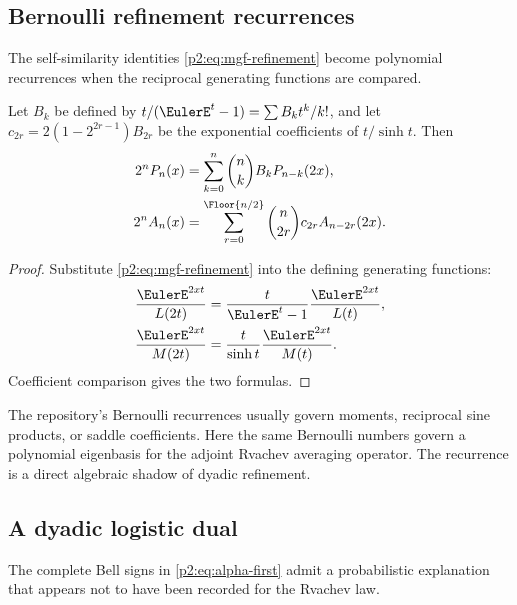 \documentclass[11pt,oneside]{article}
\numberwithin{equation}{section}
\theoremstyle{definition}
\theoremstyle{remark}
\begin{document}
\subsection{Bernoulli refinement recurrences}

The self-similarity identities \eqref{p2:eq:mgf-refinement} become polynomial recurrences when the
reciprocal generating functions are compared.

\begin{proposition}
\label{p2:prop:Bernoulli-refinement}
Let $B_k$ be defined by $t/(\EulerE^t-1)=\sum B_kt^k/k!$, and let
$c_{2r}=2(1-2^{2r-1})B_{2r}$ be the exponential coefficients of
$t/\sinh t$.  Then
\begin{align}
 2^nP_n(x)
 &=\sum_{k=0}^n\binom nkB_kP_{n-k}(2x),
 \label{p2:eq:P-Bernoulli-refinement}\\
 2^nA_n(x)
 &=\sum_{r=0}^{\Floor{n/2}}
   \binom n{2r}c_{2r}A_{n-2r}(2x).
 \label{p2:eq:A-Bernoulli-refinement}
\end{align}
\end{proposition}

\begin{proof}
Substitute \eqref{p2:eq:mgf-refinement} into the defining generating functions:
\begin{align*}
 \frac{\EulerE^{2xt}}{L(2t)}
 &=\frac{t}{\EulerE^t-1}\frac{\EulerE^{2xt}}{L(t)},\\
 \frac{\EulerE^{2xt}}{M(2t)}
 &=\frac{t}{\sinh t}\frac{\EulerE^{2xt}}{M(t)}.
\end{align*}
Coefficient comparison gives the two formulas.
\end{proof}

\begin{remark}
The repository's Bernoulli recurrences usually govern moments, reciprocal sine products, or saddle
coefficients.  Here the same Bernoulli numbers govern a polynomial eigenbasis for the adjoint
Rvachev averaging operator.  The recurrence is a direct algebraic shadow of dyadic refinement.
\end{remark}

\subsection{A dyadic logistic dual}

The complete Bell signs in \eqref{p2:eq:alpha-first} admit a probabilistic explanation that appears not
to have been recorded for the Rvachev law.
\end{document}
